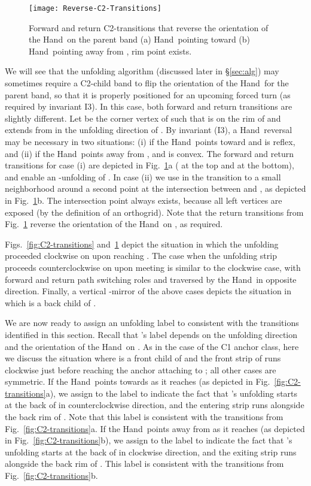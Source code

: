 \documentclass[11pt]{article}
\newcommand\hand{{\sc Hand}}
\begin{document}
\begin{figure}[htbp]
\centering
\texttt{[image: Reverse-C2-Transitions]}
\caption{Forward and return C2-transitions that reverse the orientation of the \hand\ on the parent band  (a) \hand\ pointing toward  (b) \hand\ pointing away from , rim point  exists.}
\label{fig:Reverse-C2-transitions}
\end{figure}


We will see that the unfolding algorithm (discussed later in \S\ref{sec:alg}) may sometimes require a C2-child band to flip the orientation of the \hand\ for the parent band, so that it is properly positioned for an upcoming forced turn (as required by invariant I3). In this case, both forward and return transitions are slightly different. Let  be the corner vertex of  such that  is on the rim of  and extends from  in the unfolding direction of . By invariant (I3), a \hand\ reversal may be necessary in two situations: (i) if the \hand\ points toward  and  is reflex, and (ii) if the \hand\ points away from , and  is convex. The forward and return transitions for case (i) are depicted in Fig.~\ref{fig:Reverse-C2-transitions}a ( at the top and  at the bottom), and enable an -unfolding of . In case (ii) we use in the transition to  a small neighborhood around a second point  at the intersection between  and , as depicted in Fig.~\ref{fig:Reverse-C2-transitions}b. The intersection point  always exists, because all left vertices are exposed (by the definition of an orthogrid). 
Note that the return transitions from Fig.~\ref{fig:Reverse-C2-transitions} reverse the orientation of the \hand\ on , as required.

Figs.~\ref{fig:C2-transitions} and~\ref{fig:Reverse-C2-transitions} depict the situation in which the unfolding proceeded clockwise on  upon reaching .
The case when the unfolding strip proceeds counterclockwise on  upon meeting  is similar to the clockwise case, with forward and return path switching roles and traversed by the \hand\ in opposite direction. 
Finally, a vertical -mirror of the above cases depicts the situation in which  is a back child of .

We are now ready to assign an unfolding label to  consistent with the transitions identified in this section. Recall that 's label depends on the unfolding direction and the orientation of the \hand\ on . As in the case of the C1 anchor class, here we discuss the situation where   is a front child of  and the front strip of  runs clockwise just before reaching the anchor  attaching  to ; all other cases are symmetric. If the \hand\ points towards  as it reaches  (as depicted in Fig.~\ref{fig:C2-transitions}a), we assign to  the label  to indicate the fact that 's unfolding starts at the back of  in counterclockwise direction, and the entering strip runs alongside the back rim of . Note that this label is consistent with the transitions from Fig.~\ref{fig:C2-transitions}a. If the \hand\ points away from  as it reaches  (as depicted in Fig.~\ref{fig:C2-transitions}b), we assign to  the label  to indicate the fact that 's unfolding starts at the back of  in clockwise direction, and the exiting strip runs alongside the back rim of .  This label is consistent with  the transitions from Fig.~\ref{fig:C2-transitions}b.
\end{document}
